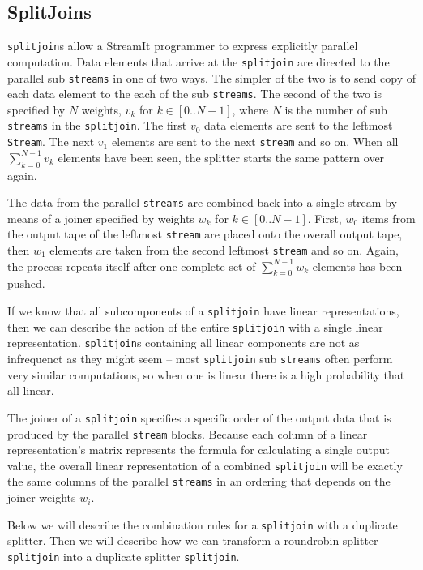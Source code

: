 \subsection{SplitJoins}
{\tt splitjoin}s allow a StreamIt programmer to express explicitly parallel computation. 
Data elements that arrive at the {\tt splitjoin} are directed
to the parallel sub {\tt streams} in one of two ways.
The simpler of the two is to send copy of each data element to the each of the sub {\tt streams}. 
The second of the two is specified by $N$ weights, $v_k$ for $k\in[0..N-1]$, 
where $N$ is the number of sub {\tt streams} in the {\tt splitjoin}. The first $v_0$ data elements
are sent to the leftmost {\tt Stream}. The next $v_1$ elements are sent 
to the next {\tt stream} and so on. When all $\sum_{k=0}^{N-1} v_k$ elements
have been seen, the splitter starts the same pattern over again.

The data from the parallel {\tt streams} are combined back into a single stream by means of
a joiner specified by weights $w_k$ for $k\in[0..N-1]$. First, $w_0$ items from the output tape of the 
leftmost {\tt stream} are placed onto the overall output tape, then 
$w_1$ elements are taken from the second leftmost {\tt stream} and so on. 
Again, the process repeats itself after one complete set of $\sum_{k=0}^{N-1} w_k$ 
elements has been pushed.

If we know that all subcomponents of a {\tt splitjoin} 
have linear representations, then we can describe the action of the entire {\tt splitjoin} 
with a single linear representation.
{\tt splitjoin}s containing all linear components are not as infrequenct as they might seem -- 
most {\tt splitjoin} sub {\tt streams} often perform very similar computations, so when one 
is linear there is a high probability that all linear.

The joiner of a {\tt splitjoin} specifies a specific order of the output data 
that is produced by the parallel {\tt stream} blocks. Because each column 
of a linear representation's matrix represents the formula for calculating a single output value, 
the overall linear representation of a combined {\tt splitjoin} will be exactly 
the same columns of the parallel {\tt streams} in an ordering that depends on the joiner weights $w_i$.

Below we will describe the combination rules for a {\tt splitjoin}
with a duplicate splitter. Then we will describe how we can transform 
a roundrobin splitter {\tt splitjoin} into a duplicate splitter {\tt splitjoin}. 


